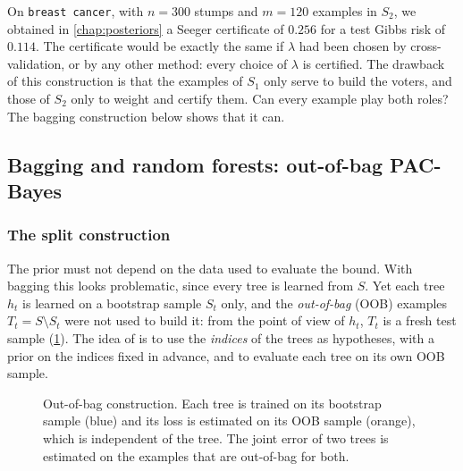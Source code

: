On \texttt{breast cancer}, with $n=300$ stumps and $m=120$ examples in $S_2$,
we obtained in \cref{chap:posteriors} a Seeger certificate of $0.256$ for a test
Gibbs risk of $0.114$. The certificate would be exactly the same if $\lambda$ had
been chosen by cross-validation, or by any other method: every choice of
$\lambda$ is certified. The drawback of this construction is that the examples of
$S_1$ only serve to build the voters, and those of $S_2$ only to weight and
certify them. Can every example play both roles? The bagging construction
below shows that it can.

\subsection{Bagging and random forests: out-of-bag PAC-Bayes}\label{sec:oob}

\subsubsection{The split construction}

The prior must not depend on the data used to evaluate the bound. With
bagging this looks problematic, since every tree is learned from $S$. Yet
each tree $h_t$ is learned on a bootstrap sample $S_t$ only, and the
\emph{out-of-bag} (OOB) examples $T_t=S\setminus S_t$ were not used to build it:
from the point of view of $h_t$, $T_t$ is a fresh test sample
(\cref{fig:oob}). The idea of \citet{thiemann2017strongly} is to use the
\emph{indices} of the trees as hypotheses, with a prior on the indices fixed in
advance, and to evaluate each tree on its own OOB sample.

\begin{figure}[t]
\centering
{}
\caption{Out-of-bag construction. Each tree is trained on its bootstrap
sample (blue) and its loss is estimated on its OOB sample (orange), which is
independent of the tree. The joint error of two trees is estimated on the
examples that are out-of-bag for both.}
\label{fig:oob}
\end{figure}

